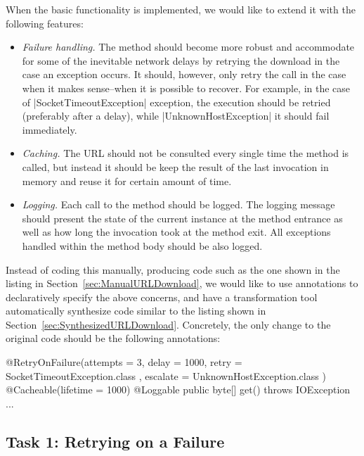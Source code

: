 When the basic functionality is implemented, we would like to extend it with the following features:

\begin{itemize}[--]
   \item \emph{Failure handling.} The method should become more robust and accommodate for some of the inevitable network delays by retrying the download in the case an exception occurs.
   It should, however, only retry the call in the case when it makes sense--\Ie when it is possible to recover.
   For example, in the case of \javainline|SocketTimeoutException| exception, the execution should be retried (preferably after a delay), while \javainline|UnknownHostException| it should fail immediately.
   \item \emph{Caching.} The URL should not be consulted every single time the method is called, but instead it should be keep the result of the last invocation in memory and reuse it for certain amount of time.
   \item \emph{Logging.} Each call to the method should be logged.
   The logging message should present the state of the current instance at the method entrance as well as how long the invocation took at the method exit.
   All exceptions handled within the method body should be also logged.
\end{itemize} 

Instead of coding this manually, producing code such as the one shown in the listing in Section~\ref{sec:ManualURLDownload}, we would like to use annotations to declaratively specify the above concerns, and have a transformation tool automatically synthesize code similar to the listing shown in Section~\ref{sec:SynthesizedURLDownload}.
Concretely, the only change to the original code should be the following annotations:
%
\begin{javacode}
@RetryOnFailure(attempts = 3, delay = 1000, retry = { SocketTimeoutException.class }, escalate = { UnknownHostException.class })
@Cacheable(lifetime = 1000)
@Loggable
public byte[] get() throws IOException { ... }
\end{javacode}

\subsection{Task 1: Retrying on a Failure}

